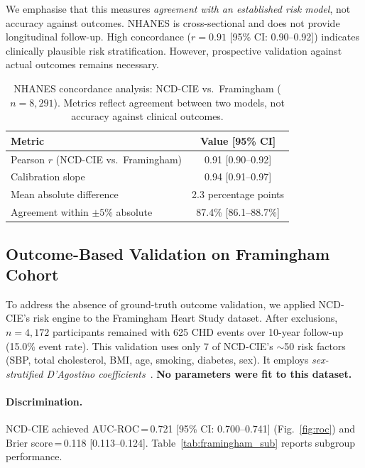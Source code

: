 \documentclass[runningheads]{llncs}
\begin{document}
We emphasise that this measures \emph{agreement with an established
risk model}, not accuracy against outcomes.
NHANES is cross-sectional and does not provide longitudinal follow-up.
High concordance ($r = 0.91$ [95\% CI: 0.90--0.92]) indicates
clinically plausible risk stratification.
However, prospective validation against actual outcomes remains
necessary.

\renewcommand{\arraystretch}{1.2}
\begin{table}[t]
\centering
\caption{NHANES concordance analysis: NCD-CIE vs.\ Framingham
($n = 8{,}291$).  Metrics reflect agreement between two models,
not accuracy against clinical outcomes.}
\label{tab:nhanes}
\small
\begin{tabular}{@{}lc@{}}
\toprule
\textbf{Metric} & \textbf{Value [95\% CI]} \\
\midrule
Pearson $r$ (NCD-CIE vs.\ Framingham) & 0.91 [0.90--0.92] \\
Calibration slope                       & 0.94 [0.91--0.97] \\
Mean absolute difference                & 2.3 percentage points \\
Agreement within $\pm 5$\% absolute     & 87.4\% [86.1--88.7\%] \\
\bottomrule
\end{tabular}
\end{table}
\renewcommand{\arraystretch}{1.0}

\subsection{Outcome-Based Validation on Framingham Cohort}\label{sec:framingham}

To address the absence of ground-truth outcome validation, we applied
NCD-CIE's risk engine to the Framingham Heart Study dataset.
After exclusions, $n = 4{,}172$ participants remained with 625 CHD
events over 10-year follow-up (15.0\% event rate).
This validation uses only 7 of NCD-CIE's ${\sim}$50 risk factors
(SBP, total cholesterol, BMI, age, smoking, diabetes, sex).
It employs \emph{sex-stratified D'Agostino
coefficients}~\cite{dagostino2008}.
\textbf{No parameters were fit to this dataset.}

\paragraph{Discrimination.}
NCD-CIE achieved AUC-ROC\,=\,0.721 [95\% CI: 0.700--0.741]
(Fig.~\ref{fig:roc}) and
Brier score\,=\,0.118 [0.113--0.124].
Table~\ref{tab:framingham_sub} reports subgroup performance.
\end{document}
